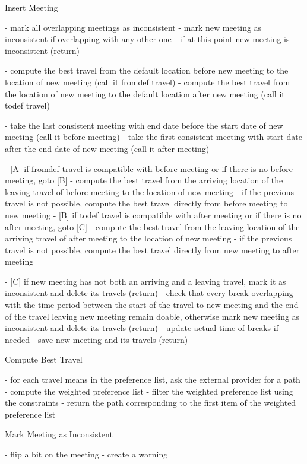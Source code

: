 Insert Meeting

- mark all overlapping meetings as inconsistent
- mark new meeting as inconsistent if overlapping with any other one
- if at this point new meeting is inconsistent (return)

- compute the best travel from the default location before new meeting to the location of new meeting (call it fromdef travel)
- compute the best travel from the location of new meeting to the default location after new meeting (call it todef travel)

- take the last consistent meeting with end date before the start date of new meeting (call it before meeting)
- take the first consistent meeting with start date after the end date of new meeting (call it after meeting)

- [A] if fromdef travel is compatible with before meeting or if there is no before meeting, goto [B]
- compute the best travel from the arriving location of the leaving travel of before meeting to the location of new meeting
- if the previous travel is not possible, compute the best travel directly from before meeting to new meeting
- [B] if todef travel is compatible with after meeting or if there is no after meeting, goto [C]
- compute the best travel from the leaving location of the arriving travel of after meeting to the location of new meeting
- if the previous travel is not possible, compute the best travel directly from new meeting to after meeting

- [C] if new meeting has not both an arriving and a leaving travel, mark it as inconsistent and delete its travels (return)
- check that every break overlapping with the time period between the start of the travel to new meeting and the end of the travel leaving new meeting remain doable, otherwise mark new meeting as inconsistent and delete its travels (return)
- update actual time of breaks if needed
- save new meeting and its travels (return)


Compute Best Travel

- for each travel means in the preference list, ask the external provider for a path
- compute the weighted preference list
- filter the weighted preference list using the constraints
- return the path corresponding to the first item of the weighted preference list

Mark Meeting as Inconsistent

- flip a bit on the meeting
- create a warning

\clearpage

